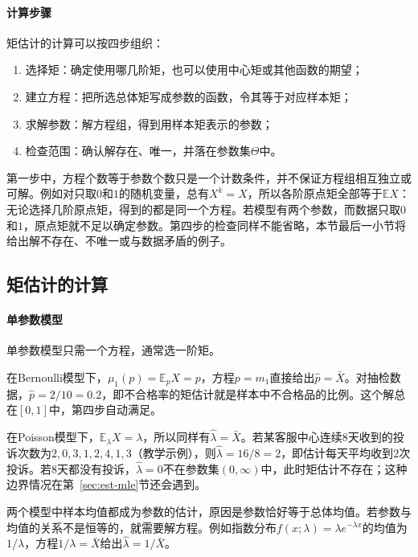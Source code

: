 \paragraph{计算步骤}
矩估计的计算可以按四步组织：
\begin{enumerate}
  \item 选择矩：确定使用哪几阶矩，也可以使用中心矩或其他函数的期望；
  \item 建立方程：把所选总体矩写成参数的函数，令其等于对应样本矩；
  \item 求解参数：解方程组，得到用样本矩表示的参数；
  \item 检查范围：确认解存在、唯一，并落在参数集$\Theta$中。
\end{enumerate}
第一步中，方程个数等于参数个数只是一个计数条件，并不保证方程组相互独立或可解。例如对只取$0$和$1$的随机变量，总有$X^k=X$，所以各阶原点矩全部等于$\mathbb{E}X$：无论选择几阶原点矩，得到的都是同一个方程。若模型有两个参数，而数据只取$0$和$1$，原点矩就不足以确定参数。第四步的检查同样不能省略，本节最后一小节将给出解不存在、不唯一或与数据矛盾的例子。

\subsection{矩估计的计算}

\paragraph{单参数模型}
单参数模型只需一个方程，通常选一阶矩。

\begin{example}[Bernoulli与Poisson模型]
\label{ex:est-mom-bernoulli-poisson}
在Bernoulli模型下，$\mu_1(p)=\mathbb{E}_pX=p$，方程$p=m_1$直接给出$\hat p=\bar X$。对抽检数据，$\hat p=2/10=0.2$，即不合格率的矩估计就是样本中不合格品的比例。这个解总在$[0,1]$中，第四步自动满足。

在Poisson模型下，$\mathbb{E}_\lambda X=\lambda$，所以同样有$\hat\lambda=\bar X$。若某客服中心连续$8$天收到的投诉次数为$2,0,3,1,2,4,1,3$（教学示例），则$\hat\lambda=16/8=2$，即估计每天平均收到$2$次投诉。若$8$天都没有投诉，$\hat\lambda=0$不在参数集$(0,\infty)$中，此时矩估计不存在；这种边界情况在第~\ref{sec:est-mle}节还会遇到。
\end{example}

两个模型中样本均值都成为参数的估计，原因是参数恰好等于总体均值。若参数与均值的关系不是恒等的，就需要解方程。例如指数分布$f(x;\lambda)=\lambda e^{-\lambda x}$的均值为$1/\lambda$，方程$1/\lambda=\bar X$给出$\hat\lambda=1/\bar X$。


